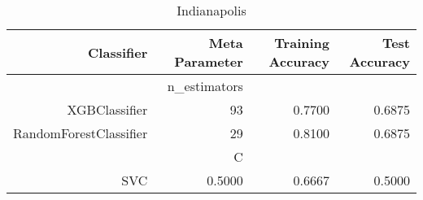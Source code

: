 
\begin{table}[H]
    \caption{Indianapolis}
    \centering
    \begin{tabular}{|r|r|r|r|}
        \hline
        Classifier &Meta Parameter &Training Accuracy
        &Test Accuracy\\
        \hline
        &n\_estimators &\multicolumn{2}{|r|}{}\\
        \hline
        XGBClassifier &93 &0.7700 &0.6875\\
        \hline
        RandomForestClassifier &29 &0.8100 &0.6875\\
        \hline
        &C &\multicolumn{2}{|r|}{}\\
        \hline
        SVC &0.5000 &0.6667 &0.5000\\
        \hline
    \end{tabular}
\end{table}
